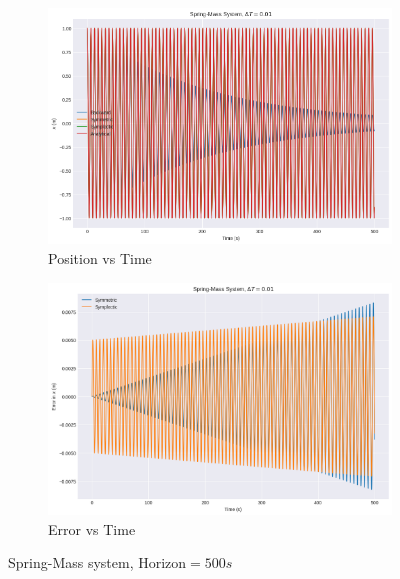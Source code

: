 \documentclass[11pt]{article}
\begin{document}
    \begin{figure}[H]
        \centering
        \begin{subfigure}[H]{0.49\linewidth}
            \includegraphics[width=\linewidth]{../sm13.png}
            \caption*{Position vs Time}
        \end{subfigure}
        \begin{subfigure}[H]{0.49\linewidth}
            \includegraphics[width=\linewidth]{../sm15.png}
            \caption*{Error vs Time}
        \end{subfigure}
        \caption*{Spring-Mass system, Horizon$ = 500s$}
        \end{figure}
\end{document}
